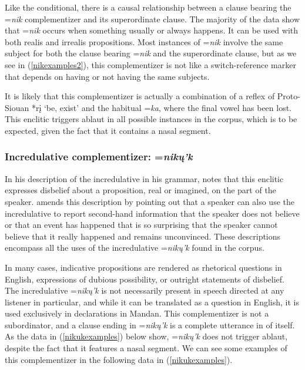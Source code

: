 Like the conditional, there is a causal relationship between a clause bearing the =\textit{nik} complementizer and its superordinate clause. The majority of the data show that =\textit{nik} occurs when something usually or always happens. It can be used with both realis and irrealis propositions. Most instances of =\textit{nik} involve the same subject for both the clause bearing =\textit{nik} and the superordinate clause, but as we see in (\ref{nikexamples2}), this complementizer is not like a switch-reference marker that depends on having or not having the same subjects.

It is likely that this complementizer is actually a combination of a reflex of Proto-Siouan *rį `be, exist' and the habitual =\textit{ka}, where the final vowel has been lost. This enclitic triggers ablaut in all possible instances in the corpus, which is to be expected, given the fact that it contains a nasal segment.

\subsubsection{Incredulative complementizer: =\textit{nikų'k}}

In his description of the incredulative in his grammar, \citet[20]{kennard1936} notes that this enclitic expresses disbelief about a proposition, real or imagined, on the part of the speaker. \citet[473]{hollow1970} amends this description by pointing out that a speaker can also use the incredulative to report second-hand information that the speaker does not believe or that an event has happened that is so surprising that the speaker cannot believe that it really happened and remains unconvinced. These descriptions encompass all the uses of the incredulative =\textit{nikų'k} found in the corpus. 

In many cases, indicative propositions are rendered as rhetorical questions in English, expressions of dubious possibility, or outright statements of disbelief. The incredulative =\textit{nikų'k} is not necessarily present in speech directed at any listener in particular, and while it can be translated as a question in English, it is used exclusively in declarations in Mandan. This complementizer is not a subordinator, and a clause ending in =\textit{nikų'k} is a complete utterance in of itself. As the data in (\ref{nikukexamples}) below show, =\textit{nikų'k} does not trigger ablaut, despite the fact that it features a nasal segment. We can see some examples of this complementizer in the following data in (\ref{nikukexamples}).

